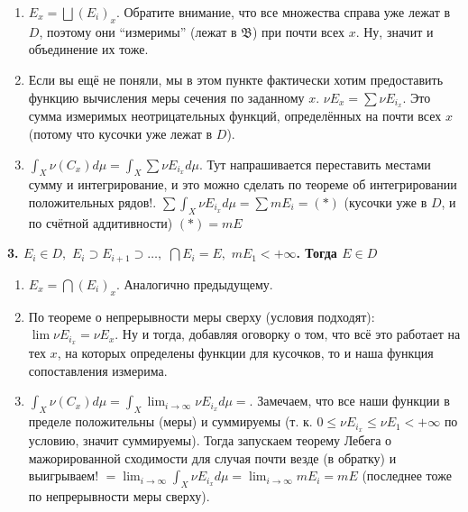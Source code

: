 \documentclass{article}
\def\dbl{\,\,}
\begin{document}
\begin{enumerate}
    \item $E_x = \bigsqcup (E_i)_x$. Обратите внимание, что все множества справа уже лежат в $D$, поэтому они ``измеримы'' (лежат в $\mathfrak{B}$) при почти всех $x$. Ну, значит и объединение их тоже.
    \item Если вы ещё не поняли, мы в этом пункте фактически хотим предоставить функцию вычисления меры сечения по заданному $x$. $\nu E_x = \sum \nu E_{i_x}$. Это сумма измеримых неотрицательных функций, определённых на почти всех $x$ (потому что кусочки уже лежат в $D$).
    \item $\int_{X} \nu(C_x) d\mu = \int_{X} \sum \nu E_{i_x} d\mu$. Тут напрашивается переставить местами сумму и интегрирование, и это можно сделать по теореме об интегрировании положительных рядов!. $\sum \int_{X} \nu E_{i_x} d\mu = \sum mE_i = (*)$ (кусочки уже в $D$, и по счётной аддитивности) $(*) = m E$
\end{enumerate}

\textbf{3. $E_i \in D, \dbl E_i \supset E_{i + 1} \supset \ldots, \dbl \bigcap E_i = E, \dbl mE_1 < +\infty$. Тогда $E \in D$}
\begin{enumerate}
    \item $E_x = \bigcap (E_i)_x$. Аналогично предыдущему.
    \item По теореме о непрерывности меры сверху (условия подходят): $\lim \nu E_{i_x} = \nu E_x$. Ну и тогда, добавляя оговорку о том, что всё это работает на тех $x$, на которых определены функции для кусочков, то и наша функция сопоставления измерима.
    \item $\int_{X} \nu(C_x) d\mu = \int_{X} \lim_{i \rightarrow \infty} \nu E_{i_x} d\mu = $. Замечаем, что все наши функции в пределе положительны (меры) и суммируемы (т. к. $0 \le \nu E_{i_x} \le \nu E_1 < +\infty$ по условию, значит суммируемы). Тогда запускаем теорему Лебега о мажорированной сходимости для случая почти везде (в обратку) и выигрываем! $= \lim_{i \rightarrow \infty} \int_{X} \nu E_{i_x} d\mu = \lim_{i \rightarrow \infty} m E_i = mE$ (последнее тоже по непрерывности меры сверху).
\end{enumerate}
\end{document}
